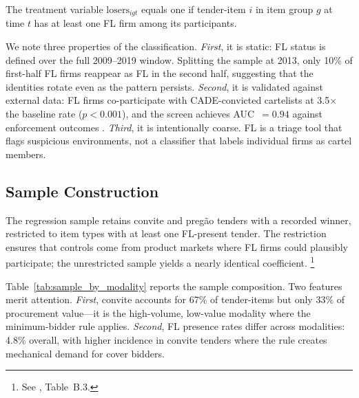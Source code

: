 \noindent The treatment variable $\text{losers}_{igt}$ equals one if
tender-item $i$ in item group $g$ at time $t$ has at least one FL
firm among its participants.

We note three properties of the classification. \emph{First}, it is
static: FL status is defined over the full 2009--2019 window.
Splitting the sample at 2013, only 10\% of first-half FL firms
reappear as FL in the second half, suggesting that the identities
rotate even as the pattern persists. \emph{Second}, it is validated
against external data: FL firms co-participate with CADE-convicted
cartelists at 3.5$\times$ the baseline rate ($p < 0.001$), and the
screen achieves AUC~$= 0.94$ against enforcement outcomes
\citep{genicolomartins2026screening}. \emph{Third}, it is
intentionally coarse. FL is a triage tool that flags suspicious
environments, not a classifier that labels individual firms as
cartel members.

\subsection{Sample Construction}
\label{sec:sample}

The regression sample retains convite and preg\~ao tenders with a
recorded winner, restricted to item types with at least one
FL-present tender. The restriction ensures that controls come from
product markets where FL firms could plausibly participate; the
unrestricted sample yields a nearly identical coefficient.%
\footnote{See \citet{genicolomartins2026screening}, Table~B.3.}

Table~\ref{tab:sample_by_modality} reports the sample composition.
Two features merit attention. \emph{First}, convite accounts for
67\% of tender-items but only 33\% of procurement value---it is the
high-volume, low-value modality where the minimum-bidder rule
applies. \emph{Second}, FL presence rates differ across modalities:
4.8\% overall, with higher incidence in convite tenders where the
rule creates mechanical demand for cover bidders.

